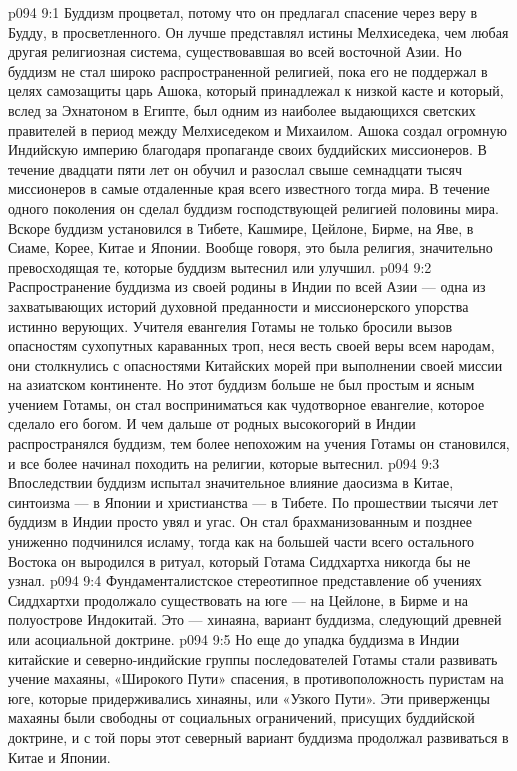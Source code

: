 \vs p094 9:1 Буддизм процветал, потому что он предлагал спасение через веру в Будду, в просветленного. Он лучше представлял истины Мелхиседека, чем любая другая религиозная система, существовавшая во всей восточной Азии. Но буддизм не стал широко распространенной религией, пока его не поддержал в целях самозащиты царь Ашока, который принадлежал к низкой касте и который, вслед за Эхнатоном в Египте, был одним из наиболее выдающихся светских правителей в период между Мелхиседеком и Михаилом. Ашока создал огромную Индийскую империю благодаря пропаганде своих буддийских миссионеров. В течение двадцати пяти лет он обучил и разослал свыше семнадцати тысяч миссионеров в самые отдаленные края всего известного тогда мира. В течение одного поколения он сделал буддизм господствующей религией половины мира. Вскоре буддизм установился в Тибете, Кашмире, Цейлоне, Бирме, на Яве, в Сиаме, Корее, Китае и Японии. Вообще говоря, это была религия, значительно превосходящая те, которые буддизм вытеснил или улучшил.
\vs p094 9:2 Распространение буддизма из своей родины в Индии по всей Азии --- одна из захватывающих историй духовной преданности и миссионерского упорства истинно верующих. Учителя евангелия Готамы не только бросили вызов опасностям сухопутных караванных троп, неся весть своей веры всем народам, они столкнулись с опасностями Китайских морей при выполнении своей миссии на азиатском континенте. Но этот буддизм больше не был простым и ясным учением Готамы, он стал восприниматься как чудотворное евангелие, которое сделало его богом. И чем дальше от родных высокогорий в Индии распространялся буддизм, тем более непохожим на учения Готамы он становился, и все более начинал походить на религии, которые вытеснил.
\vs p094 9:3 Впоследствии буддизм испытал значительное влияние даосизма в Китае, синтоизма --- в Японии и христианства --- в Тибете. По прошествии тысячи лет буддизм в Индии просто увял и угас. Он стал брахманизованным и позднее униженно подчинился исламу, тогда как на большей части всего остального Востока он выродился в ритуал, который Готама Сиддхартха никогда бы не узнал.
\vs p094 9:4 Фундаменталистское стереотипное представление об учениях Сиддхартхи продолжало существовать на юге --- на Цейлоне, в Бирме и на полуострове Индокитай. Это --- хинаяна, вариант буддизма, следующий древней или асоциальной доктрине.
\vs p094 9:5 Но еще до упадка буддизма в Индии китайские и северно\hyp{}индийские группы последователей Готамы стали развивать учение махаяны, «Широкого Пути» спасения, в противоположность пуристам на юге, которые придерживались хинаяны, или «Узкого Пути». Эти приверженцы махаяны были свободны от социальных ограничений, присущих буддийской доктрине, и с той поры этот северный вариант буддизма продолжал развиваться в Китае и Японии.
